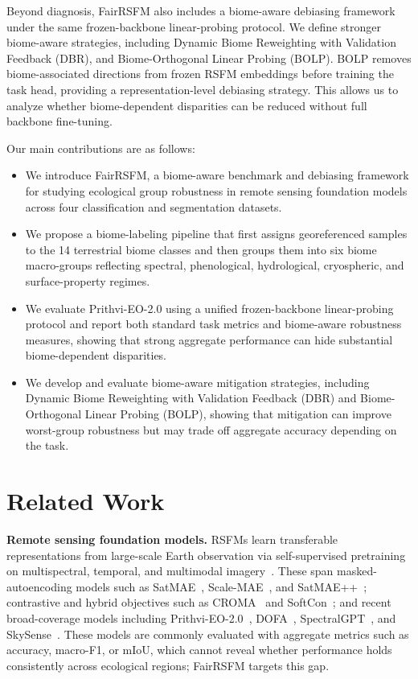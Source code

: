 \documentclass[10pt,twocolumn,letterpaper]{article}
\newcommand{\method}{FairRSFM\xspace}
\begin{document}
Beyond diagnosis, \method also includes a biome-aware debiasing framework under the same frozen-backbone linear-probing protocol. We 
define stronger biome-aware strategies, including  Dynamic Biome Reweighting with Validation Feedback (DBR), and Biome-Orthogonal Linear Probing (BOLP). BOLP removes biome-associated directions from frozen RSFM embeddings before training the task head, providing a representation-level debiasing strategy. This allows us to analyze whether biome-dependent disparities can be reduced without full backbone fine-tuning.

Our main contributions are as follows:
\begin{itemize}[leftmargin=*]
    \item We introduce \method, a biome-aware benchmark and debiasing framework for studying ecological group robustness in remote sensing foundation models across four classification and segmentation datasets.

    \item We propose a biome-labeling pipeline that first assigns georeferenced samples to the 14 terrestrial biome classes and then groups them into six biome macro-groups reflecting spectral, phenological, hydrological, cryospheric, and surface-property regimes.

    \item We evaluate Prithvi-EO-2.0 using a unified frozen-backbone linear-probing protocol and report both standard task metrics and biome-aware robustness measures, showing that strong aggregate performance can hide substantial biome-dependent disparities.
        
    \item We develop and evaluate biome-aware mitigation strategies, including Dynamic Biome Reweighting with Validation Feedback (DBR) and Biome-Orthogonal Linear Probing (BOLP), showing that mitigation can improve worst-group robustness but may trade off aggregate accuracy depending on the task.
\end{itemize}

\section{Related Work}

\noindent\textbf{Remote sensing foundation models.} RSFMs learn transferable representations from large-scale Earth observation via self-supervised pretraining on multispectral, temporal, and multimodal imagery~\cite{rsfm_survey_multimodal}. These span masked-autoencoding models such as SatMAE~\cite{satmae}, Scale-MAE~\cite{scalemae}, and SatMAE++~\cite{satmaepp}; contrastive and hybrid objectives such as CROMA~\cite{croma} and SoftCon~\cite{softcon}; and recent broad-coverage models including Prithvi-EO-2.0~\cite{prithvi2}, DOFA~\cite{dofa}, SpectralGPT~\cite{spectralgpt}, and SkySense~\cite{skysense}. These models are commonly evaluated with aggregate metrics such as accuracy, macro-F1, or mIoU, which cannot reveal whether performance holds consistently across ecological regions; \method targets this gap.
\end{document}
